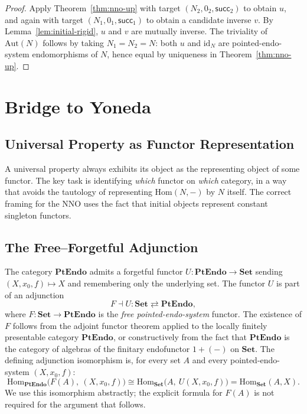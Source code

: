 \documentclass[12pt]{article}
\theoremstyle{definition}
\theoremstyle{remark}
\newcommand{\Set}{\mathbf{Set}}
\newcommand{\id}{\mathrm{id}}
\newcommand{\Hom}{\mathrm{Hom}}
\newcommand{\suc}{\mathsf{succ}}
\newcommand{\PtEndo}{\mathbf{PtEndo}}
\begin{document}
\begin{proof}
Apply Theorem~\ref{thm:nno-up} with target $(N_2, 0_2, \suc_2)$ to obtain $u$, and again with target $(N_1, 0_1, \suc_1)$ to obtain a candidate inverse $v$. By Lemma~\ref{lem:initial-rigid}, $u$ and $v$ are mutually inverse. The triviality of $\mathrm{Aut}(N)$ follows by taking $N_1 = N_2 = N$: both $u$ and $\id_N$ are pointed-endo-system endomorphisms of $N$, hence equal by uniqueness in Theorem~\ref{thm:nno-up}.
\end{proof}

\section{Bridge to Yoneda}
\label{sec:yoneda-bridge}

\subsection{Universal Property as Functor Representation}

A universal property always exhibits its object as the representing object of some functor. The key task is identifying \emph{which} functor on \emph{which} category, in a way that avoids the tautology of representing $\Hom(N, -)$ by $N$ itself. The correct framing for the NNO uses the fact that initial objects represent constant singleton functors.

\subsection{The Free--Forgetful Adjunction}

The category $\PtEndo$ admits a forgetful functor $U \colon \PtEndo \to \Set$ sending $(X, x_0, f) \mapsto X$ and remembering only the underlying set. The functor $U$ is part of an adjunction
\[
F \dashv U \colon \Set \rightleftarrows \PtEndo,
\]
where $F \colon \Set \to \PtEndo$ is the \emph{free pointed-endo-system} functor. The existence of $F$ follows from the adjoint functor theorem applied to the locally finitely presentable category $\PtEndo$, or constructively from the fact that $\PtEndo$ is the category of algebras of the finitary endofunctor $1 + (-)$ on $\Set$. The defining adjunction isomorphism is, for every set $A$ and every pointed-endo-system $(X, x_0, f)$:
\begin{equation}
\Hom_{\PtEndo}\bigl(F(A),\ (X, x_0, f)\bigr) \cong \Hom_{\Set}\bigl(A,\ U(X, x_0, f)\bigr) = \Hom_{\Set}(A, X).
\label{eq:adjunction-iso}
\end{equation}
We use this isomorphism abstractly; the explicit formula for $F(A)$ is not required for the argument that follows.
\end{document}

